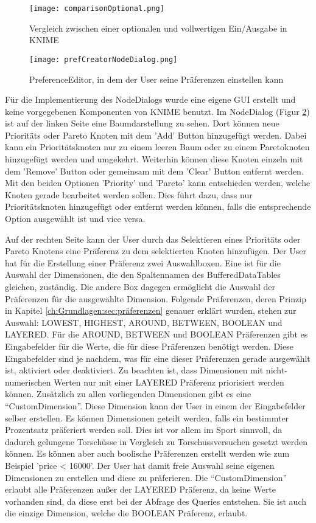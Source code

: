 \begin{figure}[H]
	\centering
	\texttt{[image: comparisonOptional.png]}
	\caption{Vergleich zwischen einer optionalen und vollwertigen Ein/Ausgabe in KNIME}
	\label{img:comparisonOptional}
\end{figure}

\begin{figure}[H]
	\centering
	\texttt{[image: prefCreatorNodeDialog.png]}
	\caption{PreferenceEditor, in dem der User seine Präferenzen einstellen kann}
	\label{img:prefCreatorNodeDialog}
\end{figure}

Für die Implementierung des NodeDialogs wurde eine eigene GUI erstellt und keine vorgegebenen Komponenten von KNIME benutzt. 
Im NodeDialog (Figur \ref{img:prefCreatorNodeDialog}) ist auf der linken Seite eine Baumdarstellung zu sehen. Dort können neue Prioritäts oder Pareto Knoten mit dem 'Add' Button hinzugefügt werden. Dabei kann ein Prioritätsknoten nur zu einem leeren Baum oder zu einem Paretoknoten hinzugefügt werden und umgekehrt. Weiterhin können diese Knoten einzeln mit dem 'Remove' Button oder gemeinsam mit dem 'Clear' Button entfernt werden. Mit den beiden Optionen 'Priority' und 'Pareto' kann entschieden werden, welche Knoten gerade bearbeitet werden sollen. Dies führt dazu, dass nur Prioritätsknoten hinzugefügt oder entfernt werden können, falls die entsprechende Option ausgewählt ist und vice versa.

Auf der rechten Seite kann der User durch das Selektieren eines Prioritäts oder Pareto Knotens eine Präferenz zu dem selektierten Knoten hinzufügen. Der User hat für die Erstellung einer Präferenz zwei Auswahlboxen. Eine ist für die Auswahl der Dimensionen, die den Spaltennamen des BufferedDataTables gleichen, zuständig. Die andere Box dagegen ermöglicht die Auswahl der Präferenzen für die ausgewählte Dimension. Folgende Präferenzen, deren Prinzip in Kapitel \ref{ch:Grundlagen:sec:präferenzen} genauer erklärt wurden, stehen zur Auswahl: LOWEST, HIGHEST, AROUND, BETWEEN, BOOLEAN und LAYERED. Für die AROUND, BETWEEN und BOOLEAN Präferenzen gibt es Eingabefelder für die Werte, die für diese Präferenzen benötigt werden. Diese Eingabefelder sind je nachdem, was für eine dieser Präferenzen gerade ausgewählt ist, aktiviert oder deaktiviert. Zu beachten ist, dass Dimensionen mit nicht-numerischen Werten nur mit einer LAYERED Präferenz priorisiert werden können. 
Zusätzlich zu allen vorliegenden Dimensionen gibt es eine \enquote{CustomDimension}. Diese Dimension kann der User in einem der Eingabefelder selber erstellen. Es können Dimensionen geteilt werden, falls ein bestimmter Prozentsatz präferiert werden soll. Dies ist vor allem im Sport sinnvoll, da dadurch gelungene Torschüsse in Vergleich zu Torschussversuchen gesetzt werden können. Es können aber auch boolische Präferenzen erstellt werden wie zum Beispiel 'price < 16000'. Der User hat damit freie Auswahl seine eigenen Dimensionen zu erstellen und diese zu präferieren. Die \enquote{CustomDimension} erlaubt alle Präferenzen außer der LAYERED Präferenz, da keine Werte vorhanden sind, da diese erst bei der Abfrage des Queries entstehen. Sie ist auch die einzige Dimension, welche die BOOLEAN Präferenz, erlaubt. 

